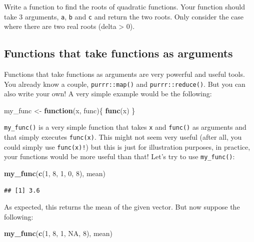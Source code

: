 \documentclass[]{gitbook}
\newenvironment{Shaded}{\begin{snugshade}}{\end{snugshade}}
\newcommand{\ControlFlowTok}[1]{\textcolor[rgb]{0.13,0.29,0.53}{\textbf{#1}}}
\newcommand{\DecValTok}[1]{\textcolor[rgb]{0.00,0.00,0.81}{#1}}
\newcommand{\KeywordTok}[1]{\textcolor[rgb]{0.13,0.29,0.53}{\textbf{#1}}}
\newcommand{\NormalTok}[1]{#1}
\newcommand{\OtherTok}[1]{\textcolor[rgb]{0.56,0.35,0.01}{#1}}
\newcommand{\StringTok}[1]{\textcolor[rgb]{0.31,0.60,0.02}{#1}}
\theoremstyle{definition}
\theoremstyle{definition}
\theoremstyle{definition}
\theoremstyle{remark}
\begin{document}
Write a function to find the roots of quadratic functions. Your function
should take 3 arguments, \texttt{a}, \texttt{b} and \texttt{c} and
return the two roots. Only consider the case where there are two real
roots (delta \textgreater{} 0).

\hypertarget{functions-that-take-functions-as-arguments}{%
\subsection{Functions that take functions as
arguments}\label{functions-that-take-functions-as-arguments}}

Functions that take functions as arguments are very powerful and useful
tools. You already know a couple, \texttt{purrr::map()} and
\texttt{purrr::reduce()}. But you can also write your own! A very simple
example would be the following:

\begin{Shaded}
\begin{Highlighting}[]
\NormalTok{my_func <-}\StringTok{ }\ControlFlowTok{function}\NormalTok{(x, func)\{}
  \KeywordTok{func}\NormalTok{(x)}
\NormalTok{\}}
\end{Highlighting}
\end{Shaded}

\texttt{my\_func()} is a very simple function that takes \texttt{x} and
\texttt{func()} as arguments and that simply executes \texttt{func(x)}.
This might not seem very useful (after all, you could simply use
\texttt{func(x)!}) but this is just for illustration purposes, in
practice, your functions would be more useful than that! Let's try to
use \texttt{my\_func()}:

\begin{Shaded}
\begin{Highlighting}[]
\KeywordTok{my_func}\NormalTok{(}\KeywordTok{c}\NormalTok{(}\DecValTok{1}\NormalTok{, }\DecValTok{8}\NormalTok{, }\DecValTok{1}\NormalTok{, }\DecValTok{0}\NormalTok{, }\DecValTok{8}\NormalTok{), mean)}
\end{Highlighting}
\end{Shaded}

\begin{verbatim}
## [1] 3.6
\end{verbatim}

As expected, this returns the mean of the given vector. But now suppose
the following:

\begin{Shaded}
\begin{Highlighting}[]
\KeywordTok{my_func}\NormalTok{(}\KeywordTok{c}\NormalTok{(}\DecValTok{1}\NormalTok{, }\DecValTok{8}\NormalTok{, }\DecValTok{1}\NormalTok{, }\OtherTok{NA}\NormalTok{, }\DecValTok{8}\NormalTok{), mean)}
\end{Highlighting}
\end{Shaded}
\end{document}
